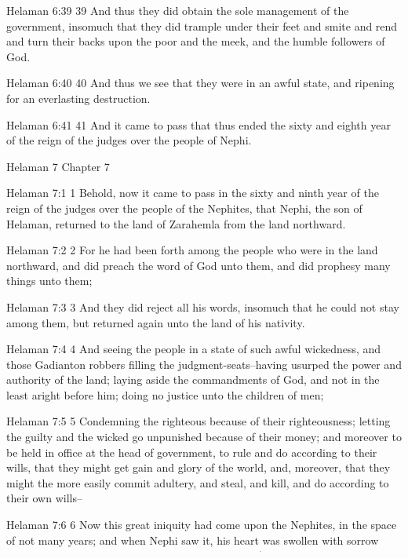 Helaman 6:39
 39 And thus they did obtain the sole management of the
government, insomuch that they did trample under their feet and
smite and rend and turn their backs upon the poor and the meek,
and the humble followers of God.

Helaman 6:40
 40 And thus we see that they were in an awful state, and
ripening for an everlasting destruction.

Helaman 6:41
 41 And it came to pass that thus ended the sixty and eighth year
of the reign of the judges over the people of Nephi.

Helaman 7
Chapter 7

Helaman 7:1
 1 Behold, now it came to pass in the sixty and ninth year of the
reign of the judges over the people of the Nephites, that Nephi,
the son of Helaman, returned to the land of Zarahemla from the
land northward.

Helaman 7:2
 2 For he had been forth among the people who were in the land
northward, and did preach the word of God unto them, and did
prophesy many things unto them;

Helaman 7:3
 3 And they did reject all his words, insomuch that he could not
stay among them, but returned again unto the land of his
nativity.

Helaman 7:4
 4 And seeing the people in a state of such awful wickedness, and
those Gadianton robbers filling the judgment-seats--having
usurped the power and authority of the land; laying aside the
commandments of God, and not in the least aright before him;
doing no justice unto the children of men;

Helaman 7:5
 5 Condemning the righteous because of their righteousness;
letting the guilty and the wicked go unpunished because of their
money; and moreover to be held in office at the head of
government, to rule and do according to their wills, that they
might get gain and glory of the world, and, moreover, that they
might the more easily commit adultery, and steal, and kill, and
do according to their own wills--

Helaman 7:6
 6 Now this great iniquity had come upon the Nephites, in the
space of not many years; and when Nephi saw it, his heart was
swollen with sorrow within his breast; and he did exclaim in the
agony of his soul:

Helaman 7:7
 7 Oh, that I could have had my days in the days when my father
Nephi first came out of the land of Jerusalem, that I could have
joyed with him in the promised land; then were his people easy to
be entreated, firm to keep the commandments of God, and slow to
be led to do iniquity; and they were quick to hearken unto the
words of the Lord--

